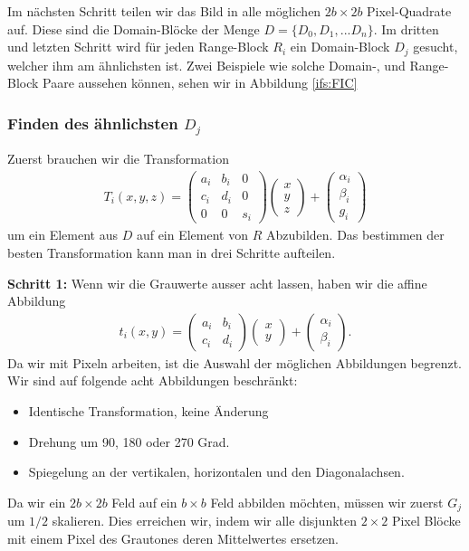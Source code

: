 Im nächsten Schritt teilen wir das Bild in alle möglichen $2b \times 2b$ Pixel-Quadrate auf. Diese sind die Domain-Blöcke der Menge $D = \{D_0,D_1,...D_n\}$. 
Im dritten und letzten Schritt wird für jeden Range-Block $R_i$ ein Domain-Block $D_j$ gesucht, welcher ihm am ähnlichsten ist.
Zwei Beispiele wie solche Domain-, und Range-Block Paare aussehen können, sehen wir in Abbildung \ref{ifs:FIC}

\subsubsection{Finden des ähnlichsten $D_j$}
Zuerst brauchen wir die Transformation 
\begin{align*}
	T_i(x,y,z) = 
	\begin{pmatrix}
		a_i & b_i & 0 \\
		c_i & d_i & 0 \\
		0 & 0 & s_i
	\end{pmatrix}
	\begin{pmatrix}
		x \\
		y \\
		z
	\end{pmatrix}
	+
	\begin{pmatrix}
		\alpha_i \\
		\beta_i \\
		g_i
	\end{pmatrix}
\end{align*}
um ein Element aus $D$ auf ein Element von $R$ Abzubilden. 
Das bestimmen der besten Transformation kann man in drei Schritte aufteilen.

\textbf{Schritt 1: }Wenn wir die Grauwerte ausser acht lassen, haben wir die affine Abbildung
\begin{align}
	t_i(x,y) = 	
	\begin{pmatrix}
		a_i & b_i \\
		c_i & d_i
	\end{pmatrix}
	\begin{pmatrix}
		x \\
		y
	\end{pmatrix}
	+
	\begin{pmatrix}
		\alpha_i \\
		\beta_i
	\end{pmatrix}.
\label{ifs:affTrans}
\end{align}
Da wir mit Pixeln arbeiten, ist die Auswahl der möglichen Abbildungen begrenzt.
Wir sind auf folgende acht Abbildungen beschränkt:
\begin{itemize}
	\item Identische Transformation, keine Änderung
	\item Drehung um 90, 180 oder 270 Grad.
	\item Spiegelung an der vertikalen, horizontalen und den Diagonalachsen.
\end{itemize}
Da wir ein $2b \times 2b$ Feld auf ein $b \times b$ Feld abbilden möchten, müssen wir zuerst $G_j$ um $1/2$ skalieren.
Dies erreichen wir, indem wir alle disjunkten $2 \times 2$ Pixel Blöcke mit einem Pixel des Grautones deren Mittelwertes ersetzen.

